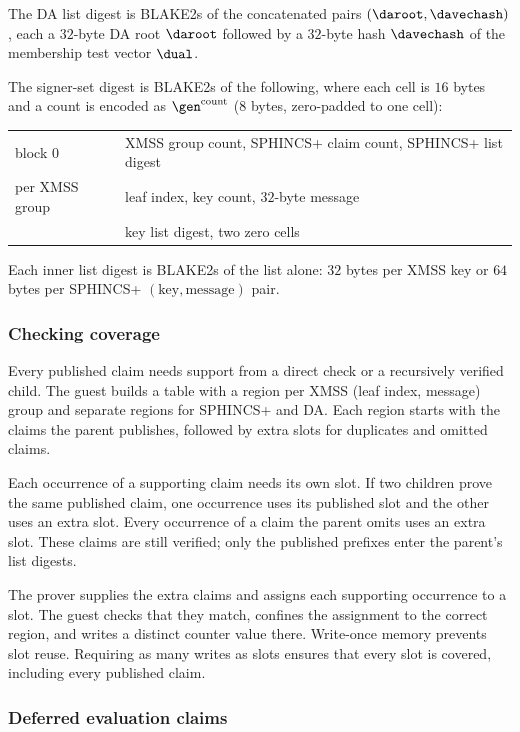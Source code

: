 The DA list digest is BLAKE2s of the concatenated pairs $(\daroot,\davechash)$, each a $32$-byte DA root $\daroot$ followed by a $32$-byte hash $\davechash$ of the membership test vector $\dual$.

The signer-set digest is BLAKE2s of the following, where each cell is $16$ bytes and a count is encoded as $\gen^{\text{count}}$ (8 bytes, zero-padded to one cell):
\begin{center}
\begin{tabular}{@{}ll@{}}
\hline
block $0$ & XMSS group count, SPHINCS+ claim count, SPHINCS+ list digest\\
per XMSS group & leaf index, key count, $32$-byte message\\
& key list digest, two zero cells\\
\hline
\end{tabular}
\end{center}
Each inner list digest is BLAKE2s of the list alone: $32$ bytes per XMSS key or $64$ bytes per SPHINCS+ $(\text{key},\text{message})$ pair.

\subsubsection{Checking coverage}

Every published claim needs support from a direct check or a recursively verified child. The guest builds a table with a region per XMSS (leaf index, message) group and separate regions for SPHINCS+ and DA. Each region starts with the claims the parent publishes, followed by extra slots for duplicates and omitted claims.

Each occurrence of a supporting claim needs its own slot. If two children prove the same published claim, one occurrence uses its published slot and the other uses an extra slot. Every occurrence of a claim the parent omits uses an extra slot. These claims are still verified; only the published prefixes enter the parent's list digests.

The prover supplies the extra claims and assigns each supporting occurrence to a slot. The guest checks that they match, confines the assignment to the correct region, and writes a distinct counter value there. Write-once memory prevents slot reuse. Requiring as many writes as slots ensures that every slot is covered, including every published claim.

\subsubsection{Deferred evaluation claims}\label{sec:deferred-claims}

